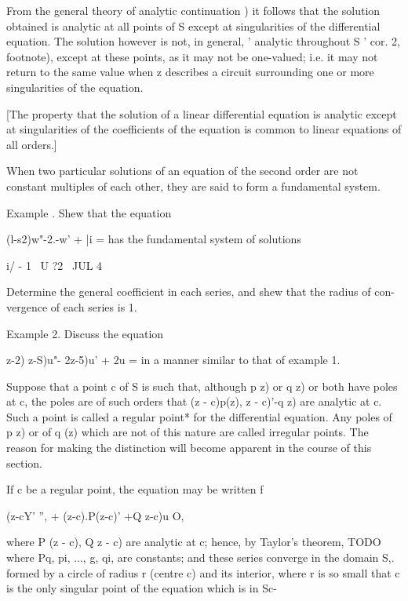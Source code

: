 From the general theory of analytic continuation ) it follows
that the solution obtained is analytic at all points of S except at
singularities of the differential equation. The solution however is
not, in general, ' analytic throughout S '  cor. 2, footnote),
except at these points, as it may not be one-valued; i.e. it may not
return to the same value when z describes a circuit surrounding one or
more singularities of the equation.

%
%

[The property that the solution of a linear differential equation is
analytic except at singularities of the coefficients of the equation
is common to linear equations of all orders.]

When two particular solutions of an equation of the second order are
not constant multiples of each other, they are said to form a
fundamental system.

Example . Shew that the equation

(l-s2)w"-2.-w' + |i = has the fundamental system of solutions

i/ - 1 \ U ?2 \ JUL 4 \

Determine the general coefficient in each series, and shew that the
radius of con- vergence of each series is 1.

Example 2. Discuss the equation

 z-2) z-S)u"- 2z-5)u' + 2u = in a manner similar to that of example 1.


Suppose that a point c of S is such that, although p z) or q z) or
both have poles at c, the poles are of such orders that (z - c)p(z), z
- c)'-q z) are analytic at c. Such a point is called a regular point*
for the differential equation. Any poles of p z) or of q (z) which are
not of this nature are called irregular points. The reason for making
the distinction will become apparent in the course of this section.

If c be a regular point, the equation may be written f

(z-cY' '', + (z-c).P(z-c)' +Q z-c)u O,

where P (z - c), Q z - c) are analytic at c; hence, by Taylor's
theorem,
TODO
where Pq, pi, ..., g, qi,  are constants; and these series
converge in the domain S,. formed by a circle of radius r (centre c)
and its interior, where r is so small that c is the only singular
point of the equation which is in Sc-

